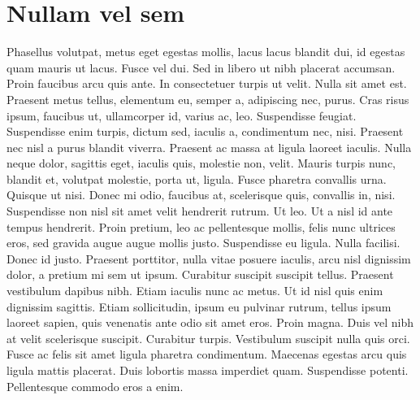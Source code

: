 \section{Nullam vel sem}
Phasellus volutpat, metus eget egestas mollis, lacus lacus blandit dui, id egestas quam mauris ut lacus. Fusce vel dui. Sed in libero ut nibh placerat accumsan. Proin faucibus arcu quis ante. In consectetuer turpis ut velit. Nulla sit amet est. Praesent metus tellus, elementum eu, semper a, adipiscing nec, purus. Cras risus ipsum, faucibus ut, ullamcorper id, varius ac, leo. Suspendisse feugiat. Suspendisse enim turpis, dictum sed, iaculis a, condimentum nec, nisi. Praesent nec nisl a purus blandit viverra. Praesent ac massa at ligula laoreet iaculis. Nulla neque dolor, sagittis eget, iaculis quis, molestie non, velit. Mauris turpis nunc, blandit et, volutpat molestie, porta ut, ligula. Fusce pharetra convallis urna. Quisque ut nisi. Donec mi odio, faucibus at, scelerisque quis, convallis in, nisi. Suspendisse non nisl sit amet velit hendrerit rutrum. Ut leo. Ut a nisl id ante tempus hendrerit. Proin pretium, leo ac pellentesque mollis, felis nunc ultrices eros, sed gravida augue augue mollis justo. Suspendisse eu ligula. Nulla facilisi. Donec id justo. Praesent porttitor, nulla vitae posuere iaculis, arcu nisl dignissim dolor, a pretium mi sem ut ipsum. Curabitur suscipit suscipit tellus. Praesent vestibulum dapibus nibh. Etiam iaculis nunc ac metus. Ut id nisl quis enim dignissim sagittis. Etiam sollicitudin, ipsum eu pulvinar rutrum, tellus ipsum laoreet sapien, quis venenatis ante odio sit amet eros. Proin magna. Duis vel nibh at velit scelerisque suscipit. Curabitur turpis. Vestibulum suscipit nulla quis orci. Fusce ac felis sit amet ligula pharetra condimentum. Maecenas egestas arcu quis ligula mattis placerat. Duis lobortis massa imperdiet quam. Suspendisse potenti. Pellentesque commodo eros a enim.

